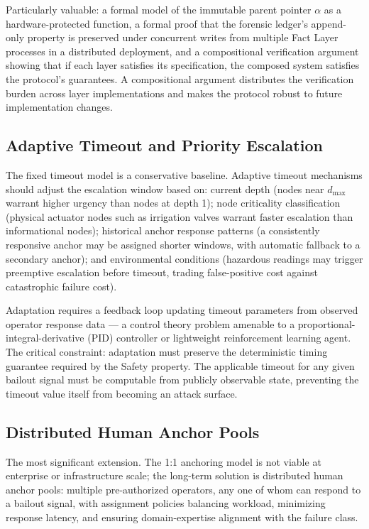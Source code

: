 Particularly valuable: a formal model of the immutable parent pointer $\alpha$ as a hardware-protected function, a formal proof that the forensic ledger's append-only property is preserved under concurrent writes from multiple Fact Layer processes in a distributed deployment, and a compositional verification argument showing that if each layer satisfies its specification, the composed system satisfies the protocol's guarantees. A compositional argument distributes the verification burden across layer implementations and makes the protocol robust to future implementation changes.

\subsection{Adaptive Timeout and Priority Escalation}
\label{sec:future-adaptive-timeout}

The fixed timeout model is a conservative baseline. Adaptive timeout mechanisms should adjust the escalation window based on: current depth (nodes near $d_{\max}$ warrant higher urgency than nodes at depth 1); node criticality classification (physical actuator nodes such as irrigation valves warrant faster escalation than informational nodes); historical anchor response patterns (a consistently responsive anchor may be assigned shorter windows, with automatic fallback to a secondary anchor); and environmental conditions (hazardous readings may trigger preemptive escalation before timeout, trading false-positive cost against catastrophic failure cost).

Adaptation requires a feedback loop updating timeout parameters from observed operator response data — a control theory problem amenable to a proportional-integral-derivative (PID) controller or lightweight reinforcement learning agent. The critical constraint: adaptation must preserve the deterministic timing guarantee required by the Safety property. The applicable timeout for any given bailout signal must be computable from publicly observable state, preventing the timeout value itself from becoming an attack surface.

\subsection{Distributed Human Anchor Pools}
\label{sec:future-anchor-pools}

The most significant extension. The 1:1 anchoring model is not viable at enterprise or infrastructure scale; the long-term solution is distributed human anchor pools: multiple pre-authorized operators, any one of whom can respond to a bailout signal, with assignment policies balancing workload, minimizing response latency, and ensuring domain-expertise alignment with the failure class.

